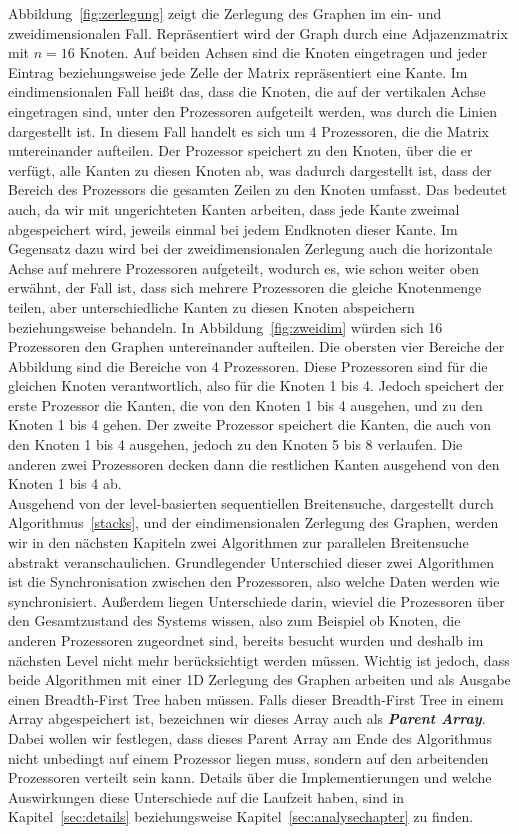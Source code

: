 \documentclass[11pt,a4paper]{article}
\begin{document}
Abbildung~\ref{fig:zerlegung} zeigt die Zerlegung des Graphen im ein- und zweidimensionalen Fall. Repräsentiert wird der Graph durch eine Adjazenzmatrix mit \(n = 16\) Knoten. Auf beiden Achsen sind die Knoten eingetragen und jeder Eintrag beziehungsweise jede Zelle der Matrix repräsentiert eine Kante. Im eindimensionalen Fall heißt das, dass die Knoten, die auf der vertikalen Achse eingetragen sind, unter den Prozessoren aufgeteilt werden, was durch die Linien dargestellt ist. In diesem Fall handelt es sich um 4 Prozessoren, die die Matrix untereinander aufteilen. Der Prozessor speichert zu den Knoten, über die er verfügt, alle Kanten zu diesen Knoten ab, was dadurch dargestellt ist, dass der Bereich des Prozessors die gesamten Zeilen zu den Knoten umfasst. Das bedeutet auch, da wir mit ungerichteten Kanten arbeiten, dass jede Kante zweimal abgespeichert wird, jeweils einmal bei jedem Endknoten dieser Kante. Im Gegensatz dazu wird bei der zweidimensionalen Zerlegung auch die horizontale Achse auf mehrere Prozessoren aufgeteilt, wodurch es, wie schon weiter oben erwähnt, der Fall ist, dass sich mehrere Prozessoren die gleiche Knotenmenge teilen, aber unterschiedliche Kanten zu diesen Knoten abspeichern beziehungsweise behandeln. In Abbildung~\ref{fig:zweidim} würden sich 16 Prozessoren den Graphen untereinander aufteilen. Die obersten vier Bereiche der Abbildung sind die Bereiche von 4 Prozessoren. Diese Prozessoren sind für die gleichen Knoten verantwortlich, also für die Knoten 1 bis 4. Jedoch speichert der erste Prozessor die Kanten, die von den Knoten 1 bis 4 ausgehen, und zu den Knoten 1 bis 4 gehen. Der zweite Prozessor speichert die Kanten, die auch von den Knoten 1 bis 4 ausgehen, jedoch zu den Knoten 5 bis 8 verlaufen. Die anderen zwei Prozessoren decken dann die restlichen Kanten ausgehend von den Knoten 1 bis 4 ab.\\
Ausgehend von der level-basierten sequentiellen Breitensuche, dargestellt durch Algorithmus~\ref{stacks}, und der eindimensionalen Zerlegung des Graphen, werden wir in den nächsten Kapiteln zwei Algorithmen zur parallelen Breitensuche abstrakt veranschaulichen. Grundlegender Unterschied dieser zwei Algorithmen ist die Synchronisation zwischen den Prozessoren, also welche Daten werden wie synchronisiert. Außerdem liegen Unterschiede darin, wieviel die Prozessoren über den Gesamtzustand des Systems wissen, also zum Beispiel ob Knoten, die anderen Prozessoren zugeordnet sind, bereits besucht wurden und deshalb im nächsten Level nicht mehr berücksichtigt werden müssen. Wichtig ist jedoch, dass beide Algorithmen mit einer 1D Zerlegung des Graphen arbeiten und als Ausgabe einen Breadth-First Tree haben müssen. Falls dieser Breadth-First Tree in einem Array abgespeichert ist, bezeichnen wir dieses Array auch als \textbf{\textit{Parent Array}}.  Dabei wollen wir festlegen, dass dieses Parent Array am Ende des Algorithmus nicht unbedingt auf einem Prozessor liegen muss, sondern auf den arbeitenden Prozessoren verteilt sein kann. Details über die Implementierungen und welche Auswirkungen diese Unterschiede auf die Laufzeit haben, sind in Kapitel~\ref{sec:details} beziehungsweise Kapitel~\ref{sec:analysechapter} zu finden.
\end{document}
